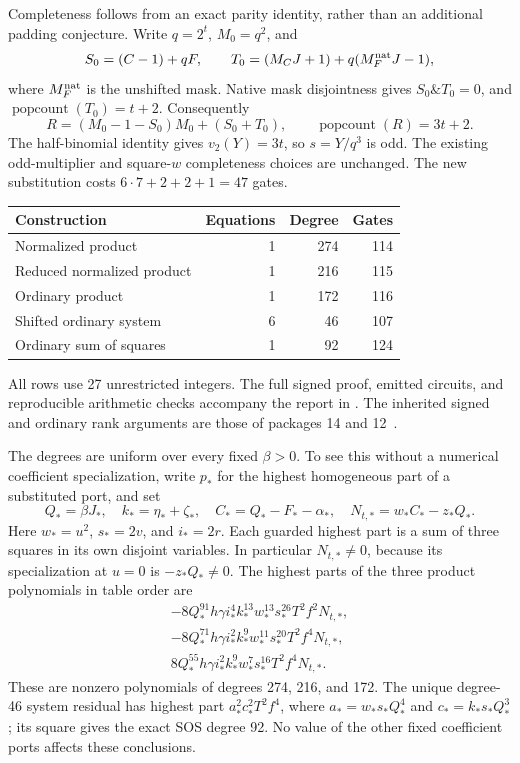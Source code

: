 Completeness follows from an exact parity identity, rather than an
additional padding conjecture. Write $q=2^t$, $M_0=q^2$, and
\[
 S_0=(C-1)+qF,\qquad
 T_0=(M_CJ+1)+q(M_F^{\rm nat}J-1),
\]
where $M_F^{\rm nat}$ is the unshifted mask. Native mask disjointness gives
$S_0\mathbin{\&}T_0=0$, and
$\operatorname{popcount}(T_0)=t+2$. Consequently
\[
 R=(M_0-1-S_0)M_0+(S_0+T_0),\qquad
 \operatorname{popcount}(R)=3t+2.
\]
The half-binomial identity gives $v_2(Y)=3t$, so $s=Y/q^3$ is odd.
The existing odd-multiplier and square-$w$ completeness choices are
unchanged. The new substitution costs $6\cdot7+2+2+1=47$ gates.

\begin{center}
\begin{tabular}{lrrr}
\hline
Construction & Equations & Degree & Gates\\
\hline
Normalized product & 1 & 274 & 114\\
Reduced normalized product & 1 & 216 & 115\\
Ordinary product & 1 & 172 & 116\\
Shifted ordinary system & 6 & 46 & 107\\
Ordinary sum of squares & 1 & 92 & 124\\
\hline
\end{tabular}
\end{center}
All rows use 27 unrestricted integers. The full signed proof, emitted
circuits, and reproducible arithmetic checks accompany the report in
. The inherited signed and ordinary
rank arguments are those of packages 14 and 12~\cite{signed29,gap}.

The degrees are uniform over every fixed $\beta>0$. To see this without
a numerical coefficient specialization, write $p_*$ for the highest
homogeneous part of a substituted port, and set
\[
 Q_*=\beta J_*,\quad k_*=\eta_*+\zeta_*,\quad
 C_*=Q_*-F_*-\alpha_*,\quad
 N_{t,*}=w_*C_*-z_*Q_*.
\]
Here $w_*=u^2$, $s_*=2v$, and $i_*=2r$. Each guarded highest part is
a sum of three squares in its own disjoint variables. In particular
$N_{t,*}\ne0$, because its specialization at $u=0$ is $-z_*Q_*\ne0$.
The highest parts of the three product polynomials in table order are
\[
\begin{aligned}
 -8Q_*^{91}h\gamma i_*^4k_*^{13}w_*^{13}s_*^{26}T^2f^2N_{t,*},\\
 -8Q_*^{71}h\gamma i_*^2k_*^9w_*^{11}s_*^{20}T^2f^4N_{t,*},\\
  8Q_*^{55}h\gamma i_*^2k_*^9w_*^7s_*^{16}T^2f^4N_{t,*}.
\end{aligned}
\]
These are nonzero polynomials of degrees 274, 216, and 172. The unique
degree-46 system residual has highest part $a_*^2c_*^2T^2f^4$,
where $a_*=w_*s_*Q_*^4$ and $c_*=k_*s_*Q_*^3$; its square gives
the exact SOS degree 92. No value of the other fixed coefficient ports
affects these conclusions.

